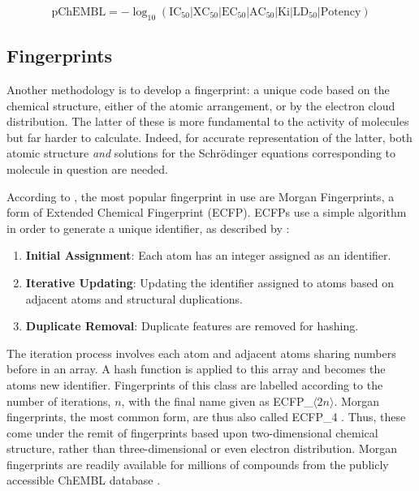 \begin{equation}
    \label{eq:pChEMBL}
    \mathrm{pChEMBL}=-\log_{10}{\left(\mathrm{IC_{50}}|\mathrm{XC_{50}}|\mathrm{EC_{50}}|\mathrm{AC_{50}}|\mathrm{Ki}|\mathrm{LD_{50}}|\mathrm{Potency}\right)}
\end{equation}

\subsection{Fingerprints}
Another methodology is to develop a fingerprint: a unique code based on the chemical structure, either of the atomic arrangement, or by the electron cloud distribution. The latter of these is more fundamental to the activity of molecules but far harder to calculate. Indeed, for accurate representation of the latter, both atomic structure \textit{and} solutions for the Schrödinger equations corresponding to molecule in question are needed.

According to \textcite{Cap20}, the most popular fingerprint in use are Morgan Fingerprints, a form of Extended Chemical Fingerprint (ECFP). ECFPs use a simple algorithm in order to generate a unique identifier, as described by \textcite{Mor2020}:

\begin{enumerate}
    \item \textbf{Initial Assignment}: Each atom has an integer assigned as an identifier.
    \item \textbf{Iterative Updating}: Updating the identifier assigned to atoms based on adjacent atoms and structural duplications.
    \item \textbf{Duplicate Removal}: Duplicate features are removed for hashing.
\end{enumerate}

The iteration process involves each atom and adjacent atoms sharing numbers before in an array. A hash function is applied to this array and becomes the atoms new identifier. Fingerprints of this class are labelled according to the number of iterations, $n$, with the final name given as ECFP\_$\langle{}2n\rangle{}$. Morgan fingerprints, the most common form, are thus also called ECFP\_4 \cite{Cap20, Mor2020}. Thus, these come under the remit of fingerprints based upon two-dimensional chemical structure, rather than three-dimensional or even electron distribution. Morgan fingerprints are readily available for millions of compounds from the publicly accessible ChEMBL database \cite{CHEMBL}.

